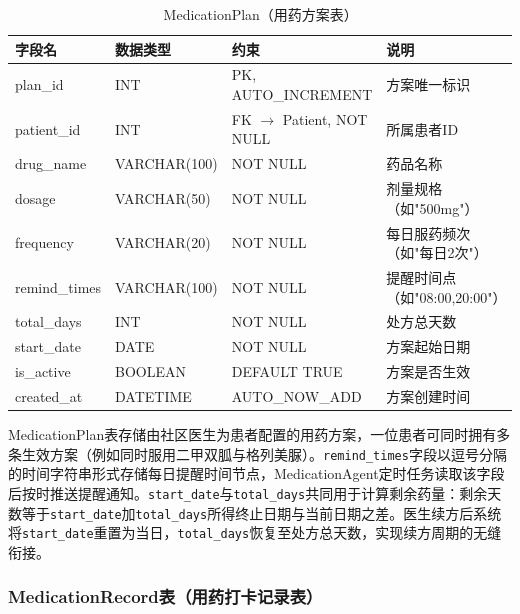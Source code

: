 \begin{table}[H]
\centering
\caption{MedicationPlan（用药方案表）}
\label{tab:table-medicationplan}
\begin{tabularx}{\textwidth}{|l|l|l|X|}
\hline
\textbf{字段名} & \textbf{数据类型} & \textbf{约束} & \textbf{说明} \\
\hline
plan\_id & INT & PK, AUTO\_INCREMENT & 方案唯一标识 \\
\hline
patient\_id & INT & FK $\rightarrow$ Patient, NOT NULL & 所属患者ID \\
\hline
drug\_name & VARCHAR(100) & NOT NULL & 药品名称 \\
\hline
dosage & VARCHAR(50) & NOT NULL & 剂量规格（如"500mg"） \\
\hline
frequency & VARCHAR(20) & NOT NULL & 每日服药频次（如"每日2次"） \\
\hline
remind\_times & VARCHAR(100) & NOT NULL & 提醒时间点（如"08:00,20:00"） \\
\hline
total\_days & INT & NOT NULL & 处方总天数 \\
\hline
start\_date & DATE & NOT NULL & 方案起始日期 \\
\hline
is\_active & BOOLEAN & DEFAULT TRUE & 方案是否生效 \\
\hline
created\_at & DATETIME & AUTO\_NOW\_ADD & 方案创建时间 \\
\hline
\end{tabularx}
\end{table}

MedicationPlan表存储由社区医生为患者配置的用药方案，一位患者可同时拥有多条生效方案（例如同时服用二甲双胍与格列美脲）。\texttt{remind\_times}字段以逗号分隔的时间字符串形式存储每日提醒时间节点，MedicationAgent定时任务读取该字段后按时推送提醒通知。\texttt{start\_date}与\texttt{total\_days}共同用于计算剩余药量：剩余天数等于\texttt{start\_date}加\texttt{total\_days}所得终止日期与当前日期之差。医生续方后系统将\texttt{start\_date}重置为当日，\texttt{total\_days}恢复至处方总天数，实现续方周期的无缝衔接。


\subsubsection{MedicationRecord表（用药打卡记录表）}

